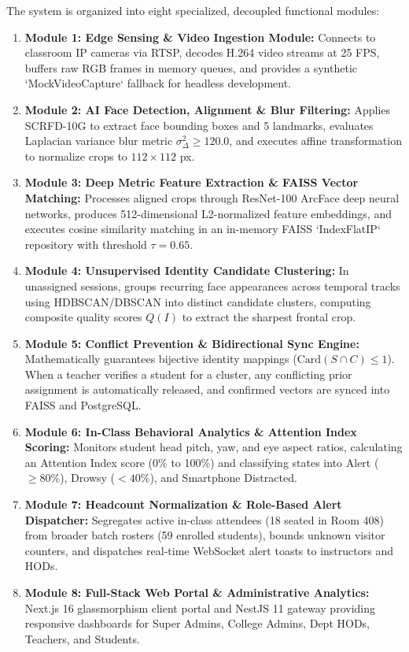 \noindent The system is organized into eight specialized, decoupled functional modules:
\begin{enumerate}
    \item \textbf{Module 1: Edge Sensing \& Video Ingestion Module:} Connects to classroom IP cameras via RTSP, decodes H.264 video streams at 25 FPS, buffers raw RGB frames in memory queues, and provides a synthetic `MockVideoCapture` fallback for headless development.
    \item \textbf{Module 2: AI Face Detection, Alignment \& Blur Filtering:} Applies SCRFD-10G to extract face bounding boxes and 5 landmarks, evaluates Laplacian variance blur metric $\sigma^2_\Delta \ge 120.0$, and executes affine transformation to normalize crops to $112 \times 112$ px.
    \item \textbf{Module 3: Deep Metric Feature Extraction \& FAISS Vector Matching:} Processes aligned crops through ResNet-100 ArcFace deep neural networks, produces 512-dimensional L2-normalized feature embeddings, and executes cosine similarity matching in an in-memory FAISS `IndexFlatIP` repository with threshold $\tau = 0.65$.
    \item \textbf{Module 4: Unsupervised Identity Candidate Clustering:} In unassigned sessions, groups recurring face appearances across temporal tracks using HDBSCAN/DBSCAN into distinct candidate clusters, computing composite quality scores $Q(I)$ to extract the sharpest frontal crop.
    \item \textbf{Module 5: Conflict Prevention \& Bidirectional Sync Engine:} Mathematically guarantees bijective identity mappings ($\text{Card}(S \cap C) \le 1$). When a teacher verifies a student for a cluster, any conflicting prior assignment is automatically released, and confirmed vectors are synced into FAISS and PostgreSQL.
    \item \textbf{Module 6: In-Class Behavioral Analytics \& Attention Index Scoring:} Monitors student head pitch, yaw, and eye aspect ratios, calculating an Attention Index score (0\% to 100\%) and classifying states into Alert ($\ge 80\%$), Drowsy ($< 40\%$), and Smartphone Distracted.
    \item \textbf{Module 7: Headcount Normalization \& Role-Based Alert Dispatcher:} Segregates active in-class attendees (18 seated in Room 408) from broader batch rosters (59 enrolled students), bounds unknown visitor counters, and dispatches real-time WebSocket alert toasts to instructors and HODs.
    \item \textbf{Module 8: Full-Stack Web Portal \& Administrative Analytics:} Next.js 16 glassmorphism client portal and NestJS 11 gateway providing responsive dashboards for Super Admins, College Admins, Dept HODs, Teachers, and Students.
\end{enumerate}

